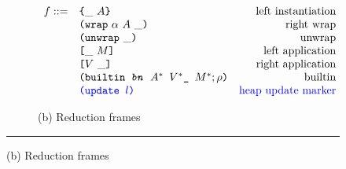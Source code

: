 \begin{figure}

\begin{subfigure}[c]{\linewidth}     %
{
\small
\caption*{(b) Reduction frames}
\[
    \begin{array}{rlr}
      f :: = & \texttt{\{}\_ ~ A\texttt{\}}                     & \textrm{left instantiation}\\
             & \texttt{(} \texttt{wrap} ~ \alpha ~ A ~ \_ \texttt{)}            & \textrm{right wrap}\\
             & \texttt{(} \texttt{unwrap} ~ \_ \texttt{)}{}                        & \textrm{unwrap}\\
             & \texttt{[} \_ ~ M \texttt{]}                      & \textrm{left application}\\
             & \texttt{[} V ~ \_ \texttt{]}                     & \textrm{right application}\\
             & \texttt{(builtin \textit{bn} $A^*\ V^*\_\ M^*; \rho$)}        & \textrm{builtin}\\
             & \textcolor{blue}{\texttt{(update\ $l$)}}                   & \textrm{\textcolor{blue}{heap update marker}}\\
    \end{array}
\]
}
\end{subfigure}

\vspace{3mm}
\hrule
\vspace{3mm}


\end{figure}
